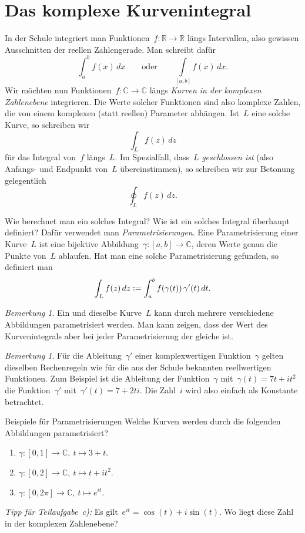 \documentclass[twoside]{../zirkelblatt1415}
\theoremstyle{definition}
\theoremstyle{plain}
\theoremstyle{remark}
\newtheorem{bem}[defn]{Bemerkung}
\newcommand{\defeq}{\vcentcolon=}
\newcommand{\RR}{\mathbb{R}}
\newcommand{\CC}{\mathbb{C}}
\begin{document}

{\renewcommand{\addvspace}[1]{\vskip0.6em}
\tableofcontents%
}


\section{Das komplexe Kurvenintegral}

In der Schule integriert man Funktionen~$f : \RR \to \RR$ längs Intervallen,
also gewissen Ausschnitten der reellen Zahlengerade. Man schreibt dafür
\[ \int_a^b f(x) \,dx \qquad\text{oder}\qquad \int\limits_{[a,b]} f(x) \,dx. \]
Wir möchten nun Funktionen~$f : \CC \to \CC$ längs \emph{Kurven in der
komplexen Zahlenebene} integrieren. Die Werte solcher Funktionen sind also
komplexe Zahlen, die von einem komplexen (statt reellen) Parameter abhängen.
Ist~$L$ eine solche Kurve, so schreiben wir \[ \int_L f(z) \,dz \] für das
Integral von~$f$ längs~$L$. Im Spezialfall, dass~$L$ \emph{geschlossen ist}
(also Anfangs- und Endpunkt von~$L$ übereinstimmen), so schreiben wir zur
Betonung gelegentlich \[ \oint_L f(z) \,dz. \]

Wie berechnet man ein solches Integral? Wie ist ein solches Integral überhaupt
definiert? Dafür verwendet man \emph{Parametrisierungen}. Eine Parametrisierung
einer Kurve~$L$ ist eine bijektive Abbildung~$\gamma : [a,b] \to \CC$, deren
Werte genau die Punkte von~$L$ ablaufen. Hat man eine solche Parametrisierung
gefunden, so definiert man
\[ \int_L f(z) \,dz \defeq \int_a^b f(\gamma(t)) \, \gamma'(t) \,dt. \]

\begin{bem}Ein und dieselbe Kurve~$L$ kann durch mehrere verschiedene
Abbildungen parametrisiert werden. Man kann zeigen, dass der Wert des
Kurvenintegrals aber bei jeder Parametrisierung der gleiche ist.\end{bem}

\begin{bem}Für die Ableitung~$\gamma'$ einer komplexwertigen Funktion~$\gamma$
gelten dieselben Rechenregeln wie für die aus der Schule bekannten
reellwertigen Funktionen. Zum Beispiel ist die Ableitung der Funktion~$\gamma$
mit~$\gamma(t) = 7t + i t^2$ die Funktion~$\gamma'$ mit~$\gamma'(t) = 7 + 2ti$.
Die Zahl~$i$ wird also einfach als Konstante betrachtet.
\end{bem}

\begin{aufgabe}{Beispiele für Parametrisierungen}
Welche Kurven werden durch die folgenden Abbildungen parametrisiert?
\begin{enumerate}
\item $\gamma : [0,1] \to \CC,\ t \mapsto 3+t.$
\item $\gamma : [0,2] \to \CC,\ t \mapsto t + i t^2.$
\item $\gamma : [0,2\pi] \to \CC,\ t \mapsto e^{it}.$
\end{enumerate}
\emph{Tipp für Teilaufgabe~c):} Es gilt~$e^{it} = \cos(t) + i \sin(t)$. Wo
liegt diese Zahl in der komplexen Zahlenebene?
\end{aufgabe}
\end{document}
